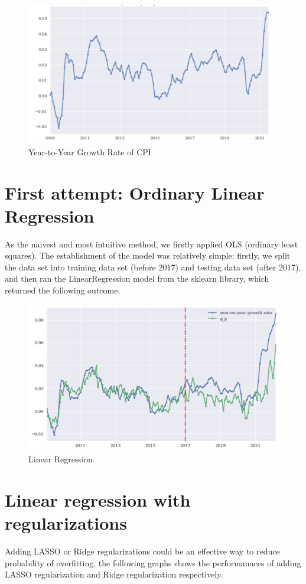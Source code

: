 \documentclass[reqno]{amsart}
\theoremstyle{definition}
\begin{document}
\begin{figure}[t]
\centering
\caption{Year-to-Year Growth Rate of CPI}
\includegraphics[scale=0.7]{growth.png}
\end{figure}


\newpage
\section{First attempt: Ordinary Linear Regression}
As the naivest and most intuitive method, we firstly applied OLS (ordinary least squares). The establishment of the model was relatively simple: firstly, we split the data set into training data set (before 2017) and testing data set (after 2017), and then ran the LinearRegression model from the sklearn library, which returned the following outcome.
\begin{figure}[h]
\centering
\caption{Linear Regression}
\includegraphics{LinearRegression.png}
\end{figure}
\newpage
\section{Linear regression with regularizations}
Adding LASSO or Ridge regularizations could be an effective way to reduce probability of overfitting, the following graphs shows the performanaces of adding LASSO regularization and Ridge regularization respectively.\\
~\\
\end{document}
